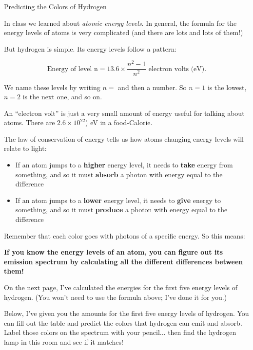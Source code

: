 \documentclass[11pt]{article}
\begin{document}
\newpage
\begin{landscape}
	
	\begin{center}
		\Large 
		Predicting the Colors of Hydrogen
	\end{center}
	
	\large 
	In class we learned about {\it atomic energy levels}. In general, the formula for the energy levels of atoms is very complicated (and there are lots and lots of them!)
	
	But hydrogen is simple. Its energy levels follow a pattern:
	
	$$\text{Energy of level n} = 13.6 \times \frac{n^2-1}{n^2} \text{ electron volts (eV)}.$$
	
	We name these levels by writing $n=$ and then a number. So $n=1$ is the lowest, $n=2$ is the next one, and so on.
	
	An ``electron volt'' is just a very small amount of energy useful for talking about atoms. There are $2.6 \times 10^{22}$) eV in a food-Calorie.
	
	The law of conservation of energy tells us how atoms changing energy levels will relate to light:
	
	
	\begin{itemize}
		\item If an atom jumps to a {\bf higher} energy level, it needs to {\bf take} energy from something, and so it must  {\bf absorb} a photon with energy equal to the difference
		\item If an atom jumps to a {\bf lower} energy level, it needs to {\bf give} energy to something, and so it must {\bf produce} a photon with energy equal to the difference
	\end{itemize}
	
	Remember that each color goes with photons of a specific energy. So this means:
	
	{\bf If you know the energy levels of an atom, you can figure out its emission spectrum by calculating all 
		the different differences between them!}
	
	On the next page, I've calculated the energies for the first five energy levels of hydrogen. (You won't need to use the formula above; I've done it for you.)
	
	\newpage
	Below, I've given you the amounts for the first five energy levels of hydrogen. You can fill out the table and predict the colors that hydrogen can emit and absorb. Label those colors on the spectrum with your pencil... then find the hydrogen lamp in this room
	and see if it matches!
	

\end{landscape}
\end{document}
